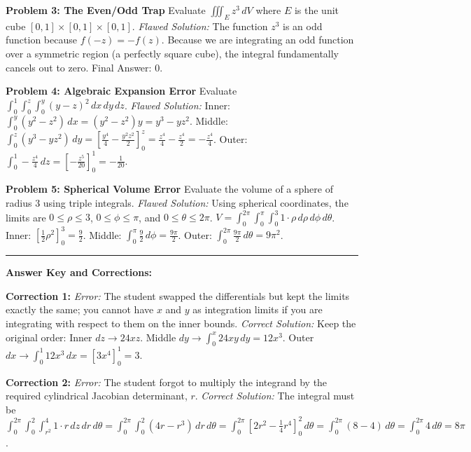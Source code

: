 \documentclass[12pt]{article}
\begin{document}
\textbf{Problem 3: The Even/Odd Trap}
Evaluate $\iiint_E z^3 \, dV$ where $E$ is the unit cube $[0,1] \times [0,1] \times [0,1]$.
\textit{Flawed Solution:} 
The function $z^3$ is an odd function because $f(-z) = -f(z)$. Because we are integrating an odd function over a symmetric region (a perfectly square cube), the integral fundamentally cancels out to zero. Final Answer: $0$.

\textbf{Problem 4: Algebraic Expansion Error}
Evaluate $\int_{0}^{1} \int_{0}^{z} \int_{0}^{y} (y-z)^2 \, dx \, dy \, dz$.
\textit{Flawed Solution:} 
Inner: $\int_{0}^{y} (y^2 - z^2) \, dx = (y^2 - z^2)y = y^3 - yz^2$. 
Middle: $\int_{0}^{z} (y^3 - yz^2) \, dy = [\frac{y^4}{4} - \frac{y^2z^2}{2}]_{0}^{z} = \frac{z^4}{4} - \frac{z^4}{2} = -\frac{z^4}{4}$. 
Outer: $\int_{0}^{1} -\frac{z^4}{4} \, dz = [-\frac{z^5}{20}]_{0}^{1} = -\frac{1}{20}$.

\textbf{Problem 5: Spherical Volume Error}
Evaluate the volume of a sphere of radius 3 using triple integrals.
\textit{Flawed Solution:} 
Using spherical coordinates, the limits are $0 \le \rho \le 3$, $0 \le \phi \le \pi$, and $0 \le \theta \le 2\pi$. 
$V = \int_{0}^{2\pi} \int_{0}^{\pi} \int_{0}^{3} 1 \cdot \rho \, d\rho \, d\phi \, d\theta$. 
Inner: $[\frac{1}{2}\rho^2]_{0}^{3} = \frac{9}{2}$. 
Middle: $\int_{0}^{\pi} \frac{9}{2} \, d\phi = \frac{9\pi}{2}$. 
Outer: $\int_{0}^{2\pi} \frac{9\pi}{2} \, d\theta = 9\pi^2$.

\vspace{0.5cm}
\hrule
\vspace{0.5cm}
\textbf{Answer Key and Corrections:}

\textbf{Correction 1:} 
\textit{Error:} The student swapped the differentials but kept the limits exactly the same; you cannot have $x$ and $y$ as integration limits if you are integrating with respect to them on the inner bounds. 
\textit{Correct Solution:} Keep the original order: Inner $dz \to 24xz$. Middle $dy \to \int_{0}^{x} 24xy \, dy = 12x^3$. Outer $dx \to \int_{0}^{1} 12x^3 \, dx = \left[ 3x^4 \right]_{0}^{1} = 3$.

\textbf{Correction 2:} 
\textit{Error:} The student forgot to multiply the integrand by the required cylindrical Jacobian determinant, $r$.
\textit{Correct Solution:} The integral must be $\int_{0}^{2\pi} \int_{0}^{2} \int_{r^2}^{4} 1 \cdot r \, dz \, dr \, d\theta = \int_{0}^{2\pi} \int_{0}^{2} (4r - r^3) \, dr \, d\theta = \int_{0}^{2\pi} \left[ 2r^2 - \frac{1}{4}r^4 \right]_{0}^{2} \, d\theta = \int_{0}^{2\pi} (8 - 4) \, d\theta = \int_{0}^{2\pi} 4 \, d\theta = 8\pi$.
\end{document}
